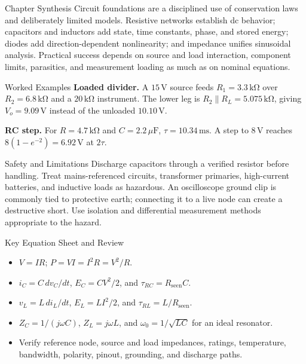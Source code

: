 \documentclass[10pt,letterpaper]{article}
\begin{document}
\begin{CornellSummaryBox}{Chapter Synthesis}
Circuit foundations are a disciplined use of conservation laws and deliberately limited models. Resistive networks establish dc behavior; capacitors and inductors add state, time constants, phase, and stored energy; diodes add direction-dependent nonlinearity; and impedance unifies sinusoidal analysis. Practical success depends on source and load interaction, component limits, parasitics, and measurement loading as much as on nominal equations.
\end{CornellSummaryBox}

\begin{CornellExamBox}{Worked Examples}
\textbf{Loaded divider.} A $15\,\mathrm{V}$ source feeds $R_1=3.3\,\mathrm{k\Omega}$ over $R_2=6.8\,\mathrm{k\Omega}$ and a $20\,\mathrm{k\Omega}$ instrument. The lower leg is $R_2\parallel R_L=5.075\,\mathrm{k\Omega}$, giving $V_o=9.09\,\mathrm{V}$ instead of the unloaded $10.10\,\mathrm{V}$.

\textbf{RC step.} For $R=4.7\,\mathrm{k\Omega}$ and $C=2.2\,\mu\mathrm{F}$, $\tau=10.34\,\mathrm{ms}$. A step to $8\,\mathrm{V}$ reaches $8(1-e^{-2})=6.92\,\mathrm{V}$ at $2\tau$.
\end{CornellExamBox}

\begin{CornellWarningBox}{Safety and Limitations}
Discharge capacitors through a verified resistor before handling. Treat mains-referenced circuits, transformer primaries, high-current batteries, and inductive loads as hazardous. An oscilloscope ground clip is commonly tied to protective earth; connecting it to a live node can create a destructive short. Use isolation and differential measurement methods appropriate to the hazard.
\end{CornellWarningBox}

\begin{CornellExamBox}{Key Equation Sheet and Review}
\begin{itemize}
	\item $V=IR$; $P=VI=I^2R=V^2/R$.
	\item $i_C=C\,dv_C/dt$, $E_C=CV^2/2$, and $\tau_{RC}=R_{\mathrm{seen}}C$.
	\item $v_L=L\,di_L/dt$, $E_L=LI^2/2$, and $\tau_{RL}=L/R_{\mathrm{seen}}$.
	\item $Z_C=1/(j\omega C)$, $Z_L=j\omega L$, and $\omega_0=1/\sqrt{LC}$ for an ideal resonator.
	\item Verify reference node, source and load impedances, ratings, temperature, bandwidth, polarity, pinout, grounding, and discharge paths.
\end{itemize}
\end{CornellExamBox}
\end{document}
